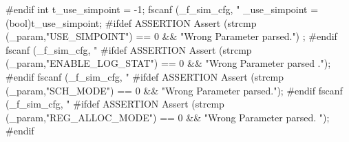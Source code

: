 \begin{DoxyCode}
{        #endif
        int t_use_simpoint = -1;
        fscanf (_f_sim_cfg, "%
        _use_simpoint =  (bool)t_use_simpoint;
        #ifdef ASSERTION
        Assert (strcmp (_param,"USE_SIMPOINT") == 0 && "Wrong Parameter parsed.")
      ;
        #endif
        fscanf (_f_sim_cfg, "%
        #ifdef ASSERTION
        Assert (strcmp (_param,"ENABLE_LOG_STAT") == 0 && "Wrong Parameter parsed
      .");
        #endif
        fscanf (_f_sim_cfg, "%
        #ifdef ASSERTION
        Assert (strcmp (_param,"SCH_MODE") == 0 && "Wrong Parameter parsed.");
        #endif
        fscanf (_f_sim_cfg, "%
        #ifdef ASSERTION
        Assert (strcmp (_param,"REG_ALLOC_MODE") == 0 && "Wrong Parameter parsed.
      ");
        #endif

}
\end{DoxyCode}

